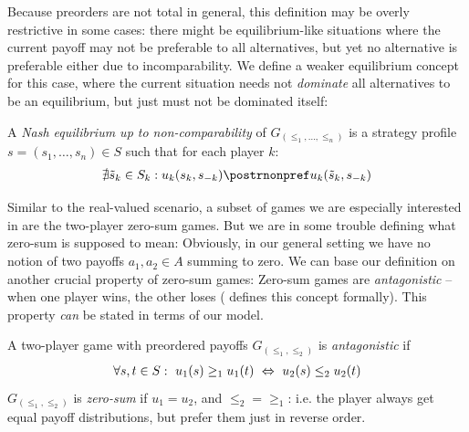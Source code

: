\documentclass[a4paper]{scrreprt}
\begin{document}
    Because preorders are not total in general, this definition may be overly restrictive in some cases: there might be equilibrium-like situations where the current payoff may not be preferable to all alternatives, but yet no alternative is preferable either due to incomparability. We define a weaker equilibrium concept for this case, where the current situation needs not \emph{dominate} all alternatives to be an equilibrium, but just must not be dominated itself:
    \begin{defn}
        A \emph{Nash equilibrium up to non-comparability} of $G_{(\leq_1, \dots, \leq_n)}$
        is a strategy profile $s = (s_1, \dots, s_n) \in S$ such that for each player $k$:
        \begin{gather}
            \nexists \tilde{s}_k \in S_k: u_k(s_k, s_{-k}) \postrnonpref u_k(\tilde{s}_k, s_{-k})
        \end{gather}
    \end{defn}
    
    Similar to the real-valued scenario, a subset of games we are especially interested in are the two-player zero-sum games.
    But we are in some trouble defining what zero-sum is supposed to mean: Obviously, in our general setting we have no notion of two payoffs $a_1, a_2 \in A$ summing to zero.
    We can base our definition on another crucial property of zero-sum games: Zero-sum games are \emph{antagonistic} -- when one player wins, the other loses (\cite{bib:andersonAntagonisticGames} defines this concept formally). This property \emph{can} be stated in terms of our model.
    
    \begin{defn}
        A two-player game with preordered payoffs $G_{(\leq_1, \leq_2)}$ is \emph{antagonistic} if
        \begin{gather*}
            \forall s, t \in S:~ u_1(s) \geq_1 u_1(t) ~\Leftrightarrow~ u_2(s) \leq_2 u_2(t)
        \end{gather*}
        $G_{(\leq_1, \leq_2)}$ is \emph{zero-sum} if $u_1 = u_2$, and $\leq_2 {=} \geq_1$: i.e. the player always get equal payoff distributions, but prefer them just in reverse order.
        \label{def:zeroSumPreorderedPayoffs}
    \end{defn}
    
\end{document}
